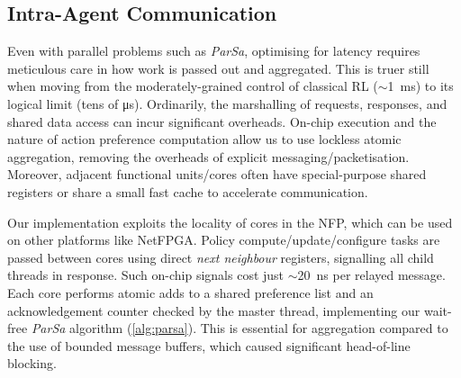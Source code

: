 \documentclass[
sigconf,natbib=false
]{acmart}
\begin{document}
\subsection{Intra-Agent Communication}\label{sec:intra-agent-communication}
Even with parallel problems such as \emph{ParSa}, optimising for latency requires meticulous care in how work is passed out and aggregated.
This is truer still when moving from the moderately-grained control of classical RL ($\sim$\SI{1}{\milli\second}) to its logical limit (tens of \si{\micro\second}).
Ordinarily, the marshalling of requests, responses, and shared data access can incur significant overheads.
On-chip execution and the nature of action preference computation allow us to use lockless atomic aggregation, removing the overheads of explicit messaging/packetisation.
Moreover, adjacent functional units/cores often have special-purpose shared registers or share a small fast cache to accelerate communication.


Our implementation exploits the locality of cores in the NFP, which can be used on other platforms like NetFPGA.
Policy compute/update/configure tasks are passed between cores using direct \emph{next neighbour} registers, signalling all child threads in response.
Such on-chip signals cost just $\sim$\SI{20}{\nano\second} per relayed message.
Each core performs atomic adds to a shared preference list and an acknowledgement counter checked by the master thread, implementing our wait-free \emph{ParSa} algorithm (\cref{alg:parsa}).
This is essential for aggregation compared to the use of bounded message buffers, which caused significant head-of-line blocking.

%
\end{document}
